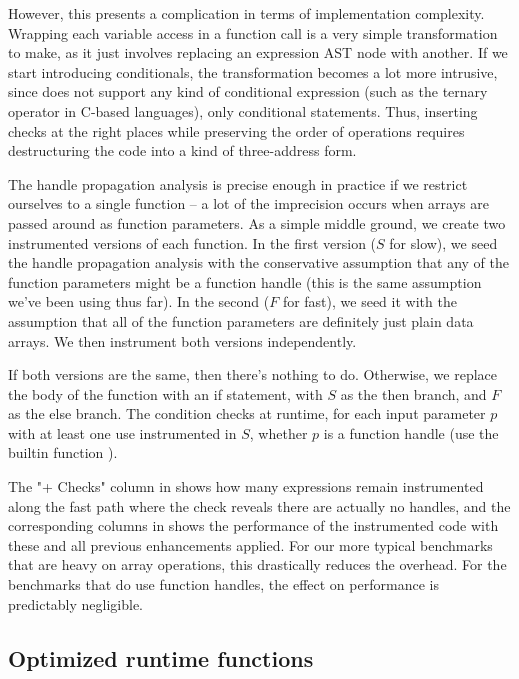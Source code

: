 However, this presents a complication in terms of implementation complexity.
Wrapping each variable access in a function call is a very simple
transformation to make, as it just involves replacing an expression AST node
with another. If we start introducing conditionals, the transformation becomes
a lot more intrusive, since \matlab does not support any kind of conditional
expression (such as the ternary \code{\?:} operator in C-based languages), only
conditional statements. Thus, inserting checks at the right places while
preserving the order of operations requires destructuring the code into a kind
of three-address form.

The handle propagation analysis is precise enough in practice if we restrict
ourselves to a single function -- a lot of the imprecision occurs when arrays
are passed around as function parameters. As a simple middle ground, we create
two instrumented versions of each function. In the first version ($S$ for
slow), we seed the handle propagation analysis with the conservative assumption
that any of the function parameters might be a function handle (this is the
same assumption we've been using thus far). In the second ($F$ for fast), we
seed it with the assumption that all of the function parameters are definitely
just plain data arrays. We then instrument both versions independently.

If both versions are the same, then there's nothing to do. Otherwise, we
replace the body of the function with an if statement, with $S$ as the then
branch, and $F$ as the else branch. The condition checks at runtime, for each
input parameter $p$ with at least one use instrumented in $S$, whether $p$
is a function handle (use the \matlab builtin function ).

The "+ Checks" column in 
 shows how many expressions remain
instrumented along the fast path where the check reveals there are actually no
handles, and the corresponding columns in 
shows the performance of the instrumented code with these and all previous
enhancements applied. For our more typical \matlab benchmarks that are heavy on
array operations, this drastically reduces the overhead. For the benchmarks
that do use function handles, the effect on performance is predictably
negligible.

\subsection{Optimized runtime functions}


